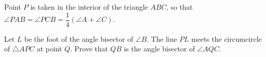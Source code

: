 Point $P$ is taken in the interior of the triangle $ABC$, so that $\angle PAB = \angle PCB = \dfrac {1} {4} (\angle A + \angle C).$

Let $L$ be the foot of the angle bisector of $\angle B$. The line $PL$ meets the circumcircle of $\triangle APC$ at point $Q$. Prove that $QB$ is the angle bisector of $\angle AQC$.
